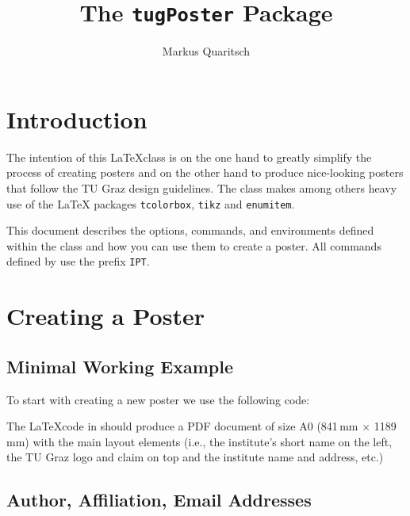 
\title{The \texttt{tugPoster} Package}
\author{Markus Quaritsch}


	\maketitle

\section{Introduction}

The intention of this \LaTeX class is on the one hand to greatly simplify the process of creating posters and on the other hand to produce nice-looking posters that follow the TU Graz design guidelines. The \tugPoster{} class makes among others heavy use of the  \LaTeX{} packages \texttt{tcolorbox}, \texttt{tikz} and \texttt{enumitem}. 

This document describes the options, commands, and environments defined within the \tugPoster class and how you can use them to create a poster. All commands defined by \tugPoster use the prefix \texttt{IPT}.


\section{Creating a Poster}

\subsection{Minimal Working Example}

To start with creating a new poster we use the following code:


The \LaTeX code in  should produce a PDF document of size A0 (841\,mm $\times$ 1189\,mm) with the main layout elements (i.e., the institute's short name on the left, the TU Graz logo and claim on top and the institute name and address, etc.)


\subsection{Author, Affiliation, Email Addresses}


